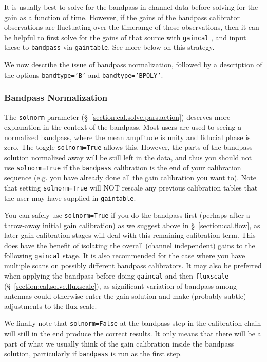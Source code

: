 It is usually best to solve for the bandpass in channel data before
solving for the gain as a function of time.  However, if the gains of
the bandpass calibrator observations are fluctuating over the
timerange of those observations, then it can be helpful to first solve
for the gains of that source with {\tt gaincal} , and input these to
{\tt bandpass} via {\tt gaintable}.  See more below on this strategy.

We now describe the issue of bandpass normalization, followed by
a description of the options {\tt bandtype='B'} and {\tt bandtype='BPOLY'}.

\subsubsection{Bandpass Normalization}
\label{section:cal.solve.band.solnorm}

The {\tt solnorm} parameter (\S~\ref{section:cal.solve.pars.action})
deserves more explanation in the context of the bandpass.  Most users
are used to seeing a normalized bandpass, where the mean amplitude
is unity and fiducial phase is zero. 
The toggle {\tt solnorm=True} allows this.  However, the parts of the
bandpass solution normalized away will be still left in the data,
and thus you should not use {\tt solnorm=True} if the {\tt bandpass}
calibration is the end of your calibration sequence (e.g. you have
already done all the gain calibration you want to).  Note that
setting {\tt solnorm=True} will NOT rescale any previous calibration
tables that the user may have supplied in {\tt gaintable}.

You can safely use {\tt solnorm=True} if you do the bandpass first
(perhaps after a throw-away initial gain calibration) as we suggest above in
\S~\ref{section:cal.flow}, as later gain calibration stages will deal with this
remaining calibration term.  This does have the benefit of isolating
the overall (channel independent) gains to the following {\tt gaincal}
stage.  It is also recommended for the case where you have multiple
scans on possibly different bandpass calibrators.  It may also be 
preferred when applying the bandpass before doing {\tt gaincal} and 
then {\tt fluxscale} (\S~\ref{section:cal.solve.fluxscale}), 
as significant variation of bandpass among antennas could otherwise 
enter the gain solution and make (probably subtle) adjustments to the
flux scale.

We finally note that {\tt solnorm=False} at the bandpass step in the
calibration chain will still in the end produce the correct results.  It
only means that there will be a part of what we usually think of the
gain calibration inside the bandpass solution, particularly if
{\tt bandpass} is run as the first step.

